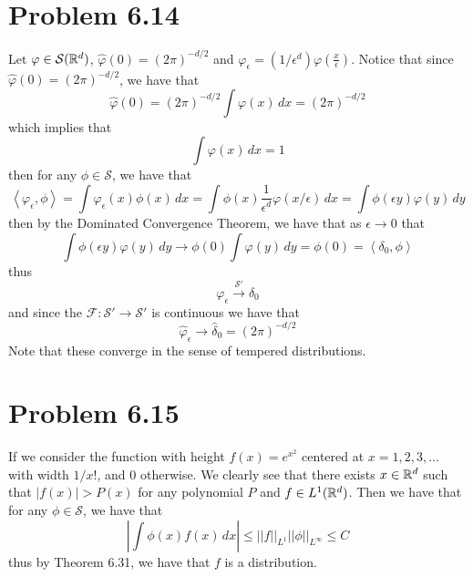 \documentclass[12pt]{report}
\newcommand{\norm}[1]{\left|\left|#1\right|\right|}
\newcommand{\inner}[2]{\left\langle#1,#2\right\rangle}
\begin{document}
\section*{Problem 6.14}
Let $\varphi \in \mathcal{S}(\mathbb{R}^d)$, $\hat{\varphi}(0) = (2\pi)^{-d/2}$ and $\varphi_\epsilon = (1/\epsilon^d)\varphi\left(\frac{x}{\epsilon}\right)$. Notice that since $\hat{\varphi}(0) = (2\pi)^{-d/2}$, we have that
\begin{equation*}
    \hat{\varphi}(0) = (2\pi)^{-d/2}\int \varphi(x) \, dx = (2\pi)^{-d/2}
\end{equation*}
which implies that
\begin{equation*}
    \int \varphi(x) \, dx = 1
\end{equation*}
then for any $\phi \in \mathcal{S}$, we have that
\begin{equation*}
    \inner{\varphi_\epsilon}{\phi} = \int \varphi_\epsilon(x) \phi(x) \, dx = \int \phi(x) \frac{1}{\epsilon^d} \varphi(x/\epsilon) \, dx = \int \phi(\epsilon y) \varphi(y)\, dy
\end{equation*}
then by the Dominated Convergence Theorem, we have that as $\epsilon \to 0$ that
\begin{equation*}
    \int \phi(\epsilon y) \varphi(y)\, dy \to \phi(0) \int \varphi(y) \, dy = \phi(0) = \inner{\delta_0}{\phi}
\end{equation*}
thus 
\begin{equation*}
    \varphi_\epsilon \xrightarrow{\mathcal{S}'} \delta_0
\end{equation*}
and since the $\mathcal{F}: \mathcal{S}' \to \mathcal{S}'$ is continuous we have that
\begin{equation*}
    \hat{\varphi}_\epsilon \to \hat{\delta}_0 = (2\pi)^{-d/2}
\end{equation*}
Note that these converge in the sense of tempered distributions.

\section*{Problem 6.15}
If we consider the function with height $f(x) = e^{x^2}$ centered at $x = 1,2,3,\dots$ with width $1/x!$, and $0$ otherwise. We clearly see that there exists $x \in \mathbb{R}^d$ such that $|f(x)| > P(x)$ for any polynomial $P$ and $f \in L^1(\mathbb{R}^d)$. Then we have that for any $\phi \in \mathcal{S}$, we have that
\begin{equation*}
    \left| \int \phi(x)f(x) \, dx\right| \leq \norm{f}_{L^1}\norm{\phi}_{L^\infty} \leq C
\end{equation*}
thus by Theorem 6.31, we have that $f$ is a distribution.
\end{document}
